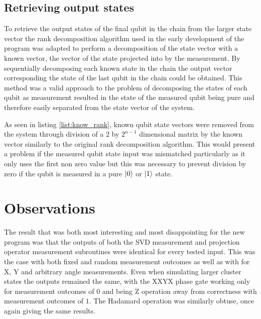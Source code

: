 
\subsection{Retrieving output states}

To retrieve the output states of the final qubit in the chain from the larger state vector the rank decomposition algorithm used in the early development of the program was adapted to perform a decomposition of the state vector with a known vector, the vector of the state projected into by the measurement. By sequentially decomposing each known state in the chain the output vector corresponding the state of the last qubit in the chain could be obtained. This method was a valid approach to the problem of decomposing the states of each qubit as measurement resulted in the state of the measured qubit being pure and therefore easily separated from the state vector of the system.



As seen in listing \ref{list:know_rank}, known qubit state vectors were removed from the system through division of a $2$ by $2^{n-1}$ dimensional matrix by the known vector similarly to the original rank decomposition algorithm. This would present a problem if the measured qubit state input was mismatched particularly as it only uses the first non zero value but this was necessary to prevent division by zero if the qubit is measured in a pure $\ket{0}$ or $\ket{1}$ state.



\section{Observations}

The result that was both most interesting and most disappointing for the new program was that the outputs of both the SVD measurement and projection operator measurement subroutines were identical for every tested input. This was the case with both fixed and random measurement outcomes as well as with for X, Y and arbitrary angle measurements. 
Even when simulating larger cluster states the outputs remained the same, with the XXYX phase gate working only for measurement outcomes of $0$ and being Z operation away from correctness with measurement outcomes of $1$. The Hadamard operation was similarly obtuse, once again giving the same results.

